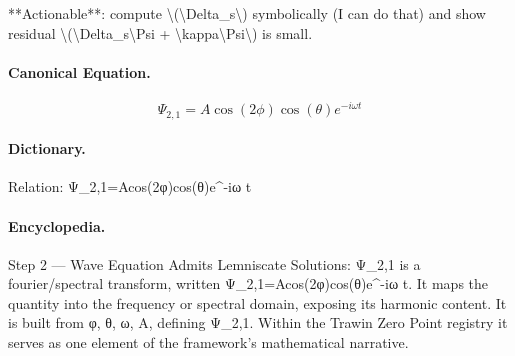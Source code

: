**Actionable**: compute \textbackslash{}(\textbackslash{}Delta\_s\textbackslash{}) symbolically (I can do that) and show residual \textbackslash{}(\textbackslash{}Delta\_s\textbackslash{}Psi + \textbackslash{}kappa\textbackslash{}Psi\textbackslash{}) is small.

\paragraph{Canonical Equation.}
\[
\Psi_{2,1}=A\cos(2\phi)\cos(\theta)e^{-i\omega t}
\]

\paragraph{Dictionary.}
Relation: Ψ\_2,1=Acos(2φ)cos(θ)e\textasciicircum{}-iω t

\paragraph{Encyclopedia.}
Step 2 — Wave Equation Admits Lemniscate Solutions: Ψ\_2,1 is a fourier/spectral transform, written Ψ\_2,1=Acos(2φ)cos(θ)e\textasciicircum{}-iω t. It maps the quantity into the frequency or spectral domain, exposing its harmonic content. It is built from φ, θ, ω, A, defining Ψ\_2,1. Within the Trawin Zero Point registry it serves as one element of the framework's mathematical narrative.
